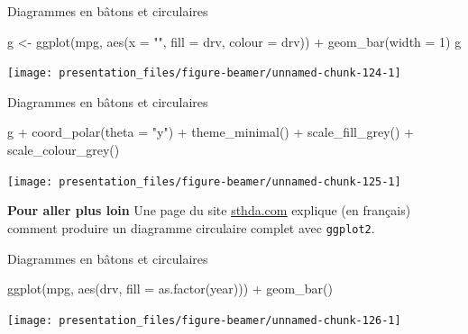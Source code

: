 \documentclass[12pt,handout,ignorenonframetext,]{beamer}
\newenvironment{Shaded}{}{}
\newcommand{\KeywordTok}[1]{\textcolor[rgb]{0.00,0.00,1.00}{{#1}}}
\newcommand{\DataTypeTok}[1]{{#1}}
\newcommand{\DecValTok}[1]{{#1}}
\newcommand{\StringTok}[1]{\textcolor[rgb]{0.00,0.50,0.50}{{#1}}}
\newcommand{\NormalTok}[1]{{#1}}
\renewenvironment{Shaded}{\begin{snugshade}}{\end{snugshade}}
\begin{document}
\begin{frame}[fragile]{Diagrammes en bâtons et circulaires}

\footnotesize \center

\begin{Shaded}
\begin{Highlighting}[]
\NormalTok{g <-}\StringTok{ }\KeywordTok{ggplot}\NormalTok{(mpg, }\KeywordTok{aes}\NormalTok{(}\DataTypeTok{x =} \StringTok{""}\NormalTok{, }\DataTypeTok{fill =} \NormalTok{drv, }\DataTypeTok{colour =} \NormalTok{drv)) +}\StringTok{ }
\StringTok{  }\KeywordTok{geom_bar}\NormalTok{(}\DataTypeTok{width =} \DecValTok{1}\NormalTok{)}
\NormalTok{g}
\end{Highlighting}
\end{Shaded}

\texttt{[image: presentation\_files/figure-beamer/unnamed-chunk-124-1]}

\end{frame}

\begin{frame}[fragile]{Diagrammes en bâtons et circulaires}

\footnotesize \center

\begin{Shaded}
\begin{Highlighting}[]
\NormalTok{g +}\StringTok{ }\KeywordTok{coord_polar}\NormalTok{(}\DataTypeTok{theta =} \StringTok{"y"}\NormalTok{) +}\StringTok{ }\KeywordTok{theme_minimal}\NormalTok{() +}
\StringTok{  }\KeywordTok{scale_fill_grey}\NormalTok{() +}\StringTok{ }\KeywordTok{scale_colour_grey}\NormalTok{()}
\end{Highlighting}
\end{Shaded}

\texttt{[image: presentation\_files/figure-beamer/unnamed-chunk-125-1]}

\pause \raggedright \small

\textbf{Pour aller plus loin} Une page du site
\href{http://www.sthda.com/french/wiki/ggplot2-graphique-en-camembert-guide-de-demarrage-rapide-logiciel-r-et-visualisation-de-donnees}{\underline{sthda.com}}
explique (en français) comment produire un diagramme circulaire complet
avec \texttt{ggplot2}.

\end{frame}

\begin{frame}[fragile]{Diagrammes en bâtons et circulaires}

\footnotesize \center

\begin{Shaded}
\begin{Highlighting}[]
\KeywordTok{ggplot}\NormalTok{(mpg, }\KeywordTok{aes}\NormalTok{(drv, }\DataTypeTok{fill =} \KeywordTok{as.factor}\NormalTok{(year))) +}\StringTok{ }
\StringTok{  }\KeywordTok{geom_bar}\NormalTok{()}
\end{Highlighting}
\end{Shaded}

\texttt{[image: presentation\_files/figure-beamer/unnamed-chunk-126-1]}

\end{frame}
\end{document}
